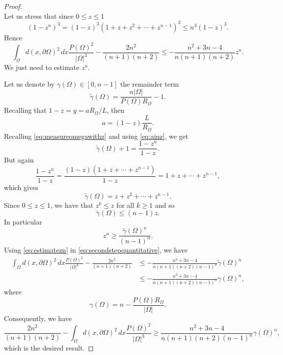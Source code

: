 \documentclass[10pt,a4paper]{amsart}
\newcommand{\abs}[1]{{\left|#1\right|}}
\begin{document}
\begin{proof}
\begin{equation*}
\end{equation*}
Let us stress that since $0\le z\le 1$
\begin{equation*}
    (1-z^n)^3= (1-z)^3(1+z+z^2+\cdots+z^{n-1})^3\le n^3(1-z)^3.
\end{equation*}
Hence
\begin{equation}\label{eq:secondstepquantitative}
   \int_{\Omega} d(x,\partial\Omega)^2\, dx \frac{P(\Omega)^2}{\abs{\Omega}^3}-\frac{2n^2}{(n+1)(n+2)}\le -\frac{n^2+3n-4}{n(n+1)(n+2)} z^n.
\end{equation}
We just need to estimate $z^n$. 

Let us denote by $\gamma(\Omega) \in [0,n-1]$ the remainder term
\begin{equation*}
    \tilde \gamma(\Omega)= \frac{n\abs{\Omega}}{P(\Omega)R_\Omega}-1.
\end{equation*}
Recalling that $1-z= y= aR_\Omega/L$, then
\begin{equation}\label{eq:ainz}
    a = (1-z)\frac{L}{R_\Omega}.
\end{equation}
Recalling \eqref{eq:measureomegawithz} and using \eqref{eq:ainz}, we get
\begin{equation*}
    \tilde \gamma(\Omega)+1 = \frac{1-z^n}{1-z}.
\end{equation*}
But again
\begin{equation*}
   \frac{1-z^n}{1-z}= \frac{(1-z)(1+z+\cdots +z^{n-1})}{1-z}= 1+z+\cdots +z^{n-1},
\end{equation*}
which gives
\begin{equation*}
    \tilde \gamma(\Omega) = z+z^2+\cdots+z^{n-1}.
\end{equation*}
Since $0\le z \le 1$, we have that $z^k\le z$ for all $k\ge 1$ and so
\begin{equation*}
    \tilde \gamma(\Omega)\le (n-1)z. 
\end{equation*}
In particular
\begin{equation}\label{eq:estimatezn}
    z^n \ge \frac{ \tilde \gamma(\Omega)^n}{(n-1)^n}.
\end{equation}
Using \eqref{eq:estimatezn} in \eqref{eq:secondstepquantitative}, we have
\begin{equation*}
\begin{aligned}
    \int_{\Omega} d(x,\partial\Omega)^2\, dx\frac{P(\Omega)^2}{\abs{\Omega}^3}-\frac{2n^2}{(n+1)(n+2)}&\le -\frac{n^2+3n-4}{n(n+1)(n+2)(n-1)^{n}}\tilde \gamma(\Omega)^n \\&\leq -\frac{n^2+3n-4}{n(n+1)(n+2)(n-1)^{n}} \gamma(\Omega)^n ,
\end{aligned}
\end{equation*}
where
$$\gamma(\Omega)= n - \frac{P(\Omega) R_{\Omega}}{\abs{\Omega}}.$$
Consequently, we have \begin{equation*}
   \frac{2n^2}{(n+1)(n+2)}-\int_{\Omega} d(x,\partial\Omega)^2\, dx\frac{P(\Omega)^2}{\abs{\Omega}^3}\ge \frac{n^2+3n-4}{n(n+1)(n+2)(n-1)^{n}}\gamma(\Omega)^n, 
\end{equation*}
which is the desired result.


\end{proof}
\end{document}
